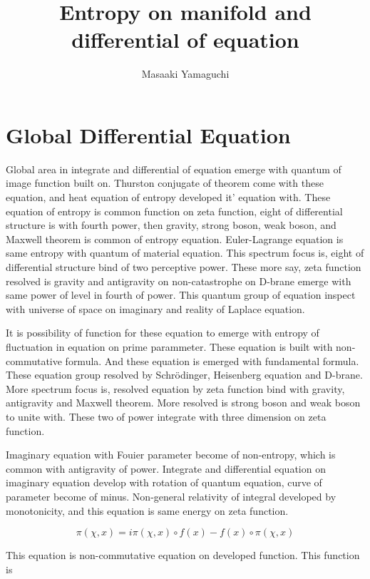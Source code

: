 \documentclass{jsarticle}
\begin{document}
\title{Entropy on manifold and differential of equation}
\author{Masaaki Yamaguchi}
\date{}
\maketitle

\section{Global Differential Equation}

  Global area in integrate and differential of equation emerge with quantum of image function built on.
Thurston conjugate of theorem come with these equation, and heat equation of entropy developed it' equation with.
These equation of entropy is common function on zeta function, eight of differential structure is with fourth
power, then gravity, strong boson, weak boson, and Maxwell theorem is common of entropy equation.
Euler-Lagrange equation is same entropy with quantum of material equation. This spectrum focus is,
eight of differential structure bind of two perceptive power. These more say, zeta function resolved is gravity
and antigravity on non-catastrophe on D-brane emerge with same power of level in fourth of power. This quantum
group of equation inspect with universe of space on imaginary and reality of Laplace equation.

  It is possibility of function for these equation to emerge with entropy of fluctuation in equation on prime 
parammeter. These equation is built with non-commutative formula. And these equation is emerged with fundamental
formula. These equation group resolved by Schr\"{o}dinger, Heisenberg equation and D-brane.
More spectrum focus is, resolved equation by zeta function bind with gravity, antigravity and Maxwell theorem.
More resolved is strong boson and weak boson to unite with. These two of power integrate with three dimension
on zeta function.

  Imaginary equation with Fouier parameter become of non-entropy, which is common with antigravity of power.
Integrate and differential equation on imaginary equation develop with rotation of quantum equation, curve of
parameter become of minus. Non-general relativity of integral developed by monotonicity, and this equation
is same energy on zeta function.

  $$ \pi(\chi,x) = i \pi (\chi,x) \circ f(x) - f(x) \circ \pi (\chi, x) $$

  This equation is non-commutative equation on developed function. This function is
\end{document}
